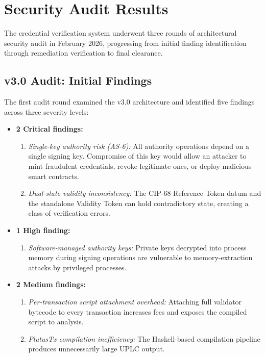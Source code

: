 \section{Security Audit Results}
\label{sec:audit}

The credential verification system underwent three rounds of architectural
security audit in February 2026, progressing from initial finding
identification through remediation verification to final clearance.

\subsection{v3.0 Audit: Initial Findings}

The first audit round examined the v3.0 architecture and identified five
findings across three severity levels:

\begin{itemize}[nosep]
  \item \textbf{2 Critical findings:}
    \begin{enumerate}[nosep]
      \item \emph{Single-key authority risk (AS-6):} All authority operations
        depend on a single signing key.  Compromise of this key would allow
        an attacker to mint fraudulent credentials, revoke legitimate ones,
        or deploy malicious smart contracts.
      \item \emph{Dual-state validity inconsistency:} The CIP-68 Reference
        Token datum and the standalone Validity Token can hold contradictory
        state, creating a class of verification errors.
    \end{enumerate}
  \item \textbf{1 High finding:}
    \begin{enumerate}[nosep]
      \item \emph{Software-managed authority keys:} Private keys decrypted
        into process memory during signing operations are vulnerable to
        memory-extraction attacks by privileged processes.
    \end{enumerate}
  \item \textbf{2 Medium findings:}
    \begin{enumerate}[nosep]
      \item \emph{Per-transaction script attachment overhead:} Attaching full
        validator bytecode to every transaction increases fees and exposes the
        compiled script to analysis.
      \item \emph{PlutusTx compilation inefficiency:} The Haskell-based
        compilation pipeline produces unnecessarily large UPLC output.
    \end{enumerate}
\end{itemize}

